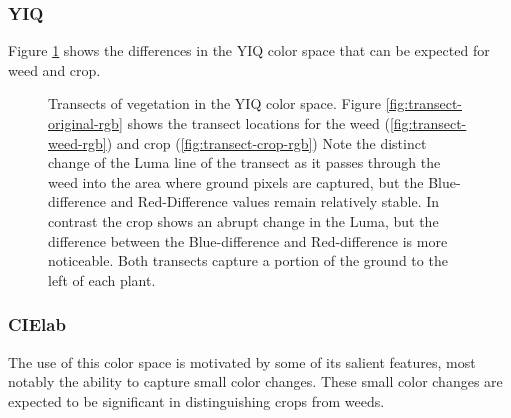 \documentclass[letterpaper, notitlepage]{report}
\begin{document}
\subsubsection{YIQ}
Figure \ref{fig:transects-yiq} shows the differences in the YIQ color space that can be expected for weed and crop.

\begin{figure}[!htb]
	\centering
	\hfill
	\hfill
	\caption[YIQ Transects]{Transects of vegetation in the YIQ color space. Figure \ref{fig:transect-original-rgb} shows the transect locations for the weed (\ref{fig:transect-weed-rgb}) and crop (\ref{fig:transect-crop-rgb}) Note the distinct change of the Luma line of the transect as it passes through the weed into the area where ground pixels are captured, but the Blue-difference and Red-Difference values remain relatively stable.  In contrast the crop shows an abrupt change in the Luma, but the difference between the Blue-difference and Red-difference is more noticeable. Both transects capture a portion of the ground to the left of each plant.}
	\label{fig:transects-yiq}
\end{figure}


\subsubsection{CIElab}
The use of this color space is motivated by some of its salient features, most notably the ability to capture small color changes. These small color changes are expected to be significant in distinguishing crops from weeds.
\end{document}
